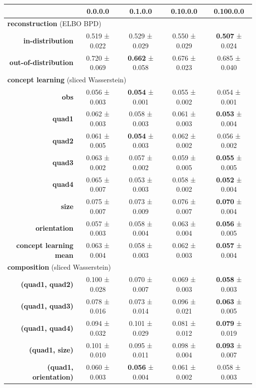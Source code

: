 \begin{tabular}{rcccc}
\toprule
& \textbf{0.0.0.0} & \textbf{0.1.0.0} & \textbf{0.10.0.0} & \textbf{0.100.0.0} \\
\midrule
\multicolumn{ 5 }{l}{\textbf{reconstruction}  (ELBO BPD)} \\
\midrule
\textbf{in-distribution} & 0.519 ± 0.022 & 0.529 ± 0.029 & 0.550 ± 0.029 & \textbf{0.507} ± 0.024 \\
\textbf{out-of-distribution} & 0.720 ± 0.069 & \textbf{0.662} ± 0.058 & 0.676 ± 0.023 & 0.685 ± 0.040 \\
\midrule
\multicolumn{ 5 }{l}{\textbf{concept learning}  (sliced Wasserstein)} \\
\midrule
\textbf{obs} & 0.056 ± 0.003 & \textbf{0.054} ± 0.001 & 0.055 ± 0.002 & 0.054 ± 0.001 \\
\textbf{quad1} & 0.062 ± 0.003 & 0.058 ± 0.003 & 0.061 ± 0.003 & \textbf{0.053} ± 0.004 \\
\textbf{quad2} & 0.061 ± 0.005 & \textbf{0.054} ± 0.003 & 0.062 ± 0.002 & 0.056 ± 0.002 \\
\textbf{quad3} & 0.063 ± 0.002 & 0.057 ± 0.002 & 0.059 ± 0.005 & \textbf{0.055} ± 0.005 \\
\textbf{quad4} & 0.065 ± 0.007 & 0.053 ± 0.003 & 0.058 ± 0.002 & \textbf{0.052} ± 0.004 \\
\textbf{size} & 0.075 ± 0.007 & 0.073 ± 0.009 & 0.076 ± 0.007 & \textbf{0.070} ± 0.004 \\
\textbf{orientation} & 0.057 ± 0.003 & 0.058 ± 0.004 & 0.063 ± 0.004 & \textbf{0.056} ± 0.005 \\
\addlinespace
\textbf{concept learning mean} & 0.063 ± 0.004 & 0.058 ± 0.003 & 0.062 ± 0.003 & \textbf{0.057} ± 0.004 \\
\midrule
\multicolumn{ 5 }{l}{\textbf{composition}  (sliced Wasserstein)} \\
\midrule
\textbf{(quad1, quad2)} & 0.100 ± 0.028 & 0.070 ± 0.007 & 0.069 ± 0.003 & \textbf{0.058} ± 0.003 \\
\textbf{(quad1, quad3)} & 0.078 ± 0.016 & 0.073 ± 0.014 & 0.096 ± 0.021 & \textbf{0.063} ± 0.005 \\
\textbf{(quad1, quad4)} & 0.094 ± 0.032 & 0.101 ± 0.029 & 0.081 ± 0.012 & \textbf{0.079} ± 0.019 \\
\textbf{(quad1, size)} & 0.101 ± 0.010 & 0.095 ± 0.011 & 0.098 ± 0.004 & \textbf{0.093} ± 0.007 \\
\textbf{(quad1, orientation)} & 0.060 ± 0.003 & \textbf{0.056} ± 0.004 & 0.061 ± 0.002 & 0.058 ± 0.003 \\

\end{tabular}
